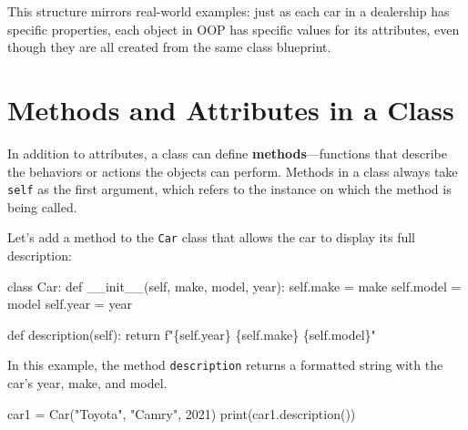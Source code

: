 \documentclass[
  letterpaper,
  DIV=11,
  numbers=noendperiod]{scrreprt}
\newenvironment{Shaded}{\begin{snugshade}}{\end{snugshade}}
\newcommand{\BuiltInTok}[1]{\textcolor[rgb]{0.00,0.23,0.31}{#1}}
\newcommand{\ControlFlowTok}[1]{\textcolor[rgb]{0.00,0.23,0.31}{#1}}
\newcommand{\DecValTok}[1]{\textcolor[rgb]{0.68,0.00,0.00}{#1}}
\newcommand{\FunctionTok}[1]{\textcolor[rgb]{0.28,0.35,0.67}{#1}}
\newcommand{\KeywordTok}[1]{\textcolor[rgb]{0.00,0.23,0.31}{#1}}
\newcommand{\NormalTok}[1]{\textcolor[rgb]{0.00,0.23,0.31}{#1}}
\newcommand{\OperatorTok}[1]{\textcolor[rgb]{0.37,0.37,0.37}{#1}}
\newcommand{\SpecialCharTok}[1]{\textcolor[rgb]{0.37,0.37,0.37}{#1}}
\newcommand{\SpecialStringTok}[1]{\textcolor[rgb]{0.13,0.47,0.30}{#1}}
\newcommand{\StringTok}[1]{\textcolor[rgb]{0.13,0.47,0.30}{#1}}
\newcommand{\VariableTok}[1]{\textcolor[rgb]{0.07,0.07,0.07}{#1}}
\begin{document}
This structure mirrors real-world examples: just as each car in a
dealership has specific properties, each object in OOP has specific
values for its attributes, even though they are all created from the
same class blueprint.

\hypertarget{methods-and-attributes-in-a-class}{%
\section{Methods and Attributes in a
Class}\label{methods-and-attributes-in-a-class}}

In addition to attributes, a class can define
\textbf{methods}---functions that describe the behaviors or actions the
objects can perform. Methods in a class always take \texttt{self} as the
first argument, which refers to the instance on which the method is
being called.

Let's add a method to the \texttt{Car} class that allows the car to
display its full description:

\begin{Shaded}
\begin{Highlighting}[]
\KeywordTok{class}\NormalTok{ Car:}
    \KeywordTok{def} \FunctionTok{\_\_init\_\_}\NormalTok{(}\VariableTok{self}\NormalTok{, make, model, year):}
        \VariableTok{self}\NormalTok{.make }\OperatorTok{=}\NormalTok{ make}
        \VariableTok{self}\NormalTok{.model }\OperatorTok{=}\NormalTok{ model}
        \VariableTok{self}\NormalTok{.year }\OperatorTok{=}\NormalTok{ year}

    \KeywordTok{def}\NormalTok{ description(}\VariableTok{self}\NormalTok{):}
        \ControlFlowTok{return} \SpecialStringTok{f"}\SpecialCharTok{\{}\VariableTok{self}\SpecialCharTok{.}\NormalTok{year}\SpecialCharTok{\}}\SpecialStringTok{ }\SpecialCharTok{\{}\VariableTok{self}\SpecialCharTok{.}\NormalTok{make}\SpecialCharTok{\}}\SpecialStringTok{ }\SpecialCharTok{\{}\VariableTok{self}\SpecialCharTok{.}\NormalTok{model}\SpecialCharTok{\}}\SpecialStringTok{"}
\end{Highlighting}
\end{Shaded}

In this example, the method \texttt{description} returns a formatted
string with the car's year, make, and model.

\begin{Shaded}
\begin{Highlighting}[]
\NormalTok{car1 }\OperatorTok{=}\NormalTok{ Car(}\StringTok{"Toyota"}\NormalTok{, }\StringTok{"Camry"}\NormalTok{, }\DecValTok{2021}\NormalTok{)}
\BuiltInTok{print}\NormalTok{(car1.description())  }
\end{Highlighting}
\end{Shaded}
\end{document}
